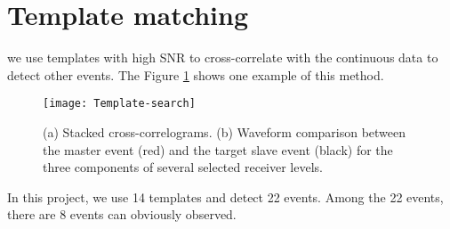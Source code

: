 \section{Template matching}
we use templates with high SNR to cross-correlate with the continuous data to detect other events. The Figure \ref{fig:method} shows one example of this method.
\begin{figure}[htbp] 
\centering 
\texttt{[image: Template-search]} 
\caption{\label{fig:method} (a) Stacked cross-correlograms. (b) Waveform comparison between the master event (red) and the target slave event (black) for the three components of several selected receiver levels.} 
\end{figure}
  In this project, we use 14 templates and detect 22 events. Among the 22 events, there are 8 events can obviously observed.

